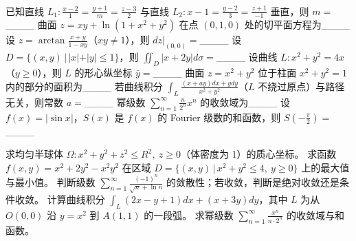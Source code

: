 \documentclass[12pt,a4paper]{exampaper}
\begin{document}

\vspace{0.8em}

\begin{center}
  \hspace{0.4em}%
  \hspace{0.4em}%
  \\[0.4em]
  \hspace{0.4em}%
  \hspace{0.4em}%
\end{center}

\vspace{0.8em}

\examscoretable[4]

\vspace{0.6em}

\begin{examquestions}
  \examquestion 已知直线 $L_1: \frac{x-2}{1}=\frac{y+1}{m}=\frac{z-3}{2}$ 与直线 $L_2: x-1=\frac{y-2}{3}=\frac{z+1}{-1}$ 垂直，则 $m=$____
  \examquestion 曲面 $z=xy+\ln(1+x^2+y^2)$ 在点 $(0,1,0)$ 处的切平面方程为____
  \examquestion 设 $z=\arctan\frac{x+y}{1-xy}$（$xy\neq 1$），则 $dz|_{(0,0)}=$____
  \examquestion 设 $D=\{(x,y)\,|\,|x|+|y|\le 1\}$，则 $\iint_D |x+2y|d\sigma=$____
  \examquestion 设曲线 $L: x^2+y^2=4x$（$y\ge 0$），则 $L$ 的形心纵坐标 $\bar{y}=$____
  \examquestion 曲面 $z=x^2+y^2$ 位于柱面 $x^2+y^2=1$ 内的部分的面积为____
  \examquestion 若曲线积分 $\int_L \frac{(x+ay)dx+ydy}{x^2+y^2}$（$L$ 不绕过原点）与路径无关，则常数 $a=$____
  \examquestion 幂级数 $\sum_{n=1}^{\infty}\frac{n}{2^n}x^n$ 的收敛域为____
  \examquestion 设 $f(x)=|\sin x|$，$S(x)$ 是 $f(x)$ 的 Fourier 级数的和函数，则 $S\left(-\frac{\pi}{2}\right)=$____
\end{examquestions}

\vspace{0.6em}

\begin{examquestions}[0pt]
  \examquestion 求均匀半球体 $\Omega: x^2+y^2+z^2\le R^2,\ z\ge 0$（体密度为 1）的质心坐标。
  \examanswerspace{7cm}
  \examquestion 求函数 $f(x,y)=x^2+2y^2-x^2y^2$ 在区域 $D=\{(x,y)\,|\,x^2+y^2\le 4,\ y\ge 0\}$ 上的最大值与最小值。
  \examanswerspace{7cm}
  \examquestion 判断级数 $\sum_{n=1}^{\infty}\frac{(-1)^n}{\sqrt{n}+\ln n}$ 的敛散性；若收敛，判断是绝对收敛还是条件收敛。
  \examanswerspace{7cm}
  \examquestion 计算曲线积分 $\int_L (2x-y+1)dx+(x+3y)dy$，其中 $L$ 为从 $O(0,0)$ 沿 $y=x^2$ 到 $A(1,1)$ 的一段弧。
  \examanswerspace{7cm}
  \examquestion 求幂级数 $\sum_{n=1}^{\infty}\frac{x^n}{n\cdot 2^n}$ 的收敛域与和函数。
  \examanswerspace{7cm}
\end{examquestions}
\end{document}
